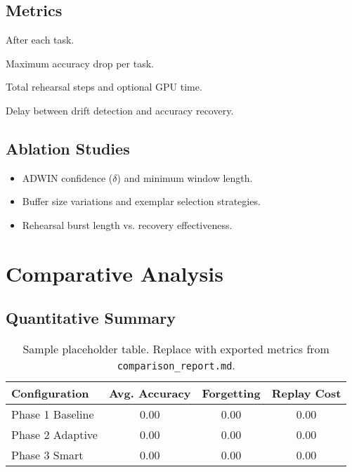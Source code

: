 \documentclass[12pt,a4paper]{article}
\begin{document}
\subsection{Metrics}
\begin{description}[style=nextline]
    \item[Average Accuracy] After each task.
    \item[Forgetting] Maximum accuracy drop per task.
    \item[Replay Cost] Total rehearsal steps and optional GPU time.
    \item[Drift Responsiveness] Delay between drift detection and accuracy recovery.
\end{description}

\subsection{Ablation Studies}
\begin{itemize}
    \item ADWIN confidence (\(\delta\)) and minimum window length.
    \item Buffer size variations and exemplar selection strategies.
    \item Rehearsal burst length vs. recovery effectiveness.
\end{itemize}

\section{Comparative Analysis}
\subsection{Quantitative Summary}
\begin{table}[H]
    \centering
    \caption{Sample placeholder table. Replace with exported metrics from \texttt{comparison\_report.md}.}
    \begin{tabular}{lccc}
        \toprule
        \textbf{Configuration} & \textbf{Avg. Accuracy} & \textbf{Forgetting} & \textbf{Replay Cost}\\
        \midrule
        Phase 1 Baseline & 0.00 & 0.00 & 0.00\\
        Phase 2 Adaptive & 0.00 & 0.00 & 0.00\\
        Phase 3 Smart & 0.00 & 0.00 & 0.00\\
        \bottomrule
    \end{tabular}
    \label{tab:quant}
\end{table}
\end{document}
